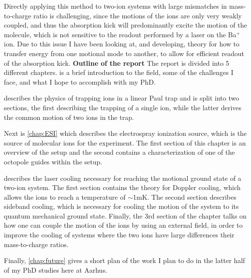 Directly applying this method to two-ion systems with large mismatches in mass-to-charge ratio is challenging, since the motions of the ions are only very weakly coupled, and thus the absorption kick will predominantly excite the motion of the molecule, which is not sensitive to the readout performed by a laser on the 
Ba$^+$ ion. Due to this issue I have been looking at, and developing, theory for how to transfer energy from one motional mode to another, to allow for efficient readout of the absorption kick.\medskip
\newline
\noindent\Large{\textbf{Outline of the report}}\newline
\normalsize The report is divided into 5 different chapters.  is a brief introduction to the field, some of the challenges I face, and what I hope to accomplish with my PhD.

 describes the physics of trapping ions in a linear Paul trap and is split into two sections, the first describing the trapping of a single ion, while the latter derives the common motion of two ions in the trap.

Next is \cref{chap:ESI} which describes the electrospray ionization source, which is the source of molecular ions for the experiment. The first section of this chapter is an overview of the setup and the second contains a characterization of one of the octopole guides within the setup.

 describes the laser cooling necessary for reaching the motional ground state of a two-ion system. The first section contains the theory for Doppler cooling, which allows the ions to reach a temperature of $\sim$1mK. The second section describes sideband cooling, which is necessary for cooling the motion of the system to its quantum mechanical ground state. Finally, the 3rd section of the chapter talks on how one can couple the motion of the ions by using an external field, in order to improve the cooling of systems where the two ions have large differences their mass-to-charge ratios.

Finally, \cref{chap:future} gives a short plan of the work I plan to do in the latter half of my PhD studies here at Aarhus.

